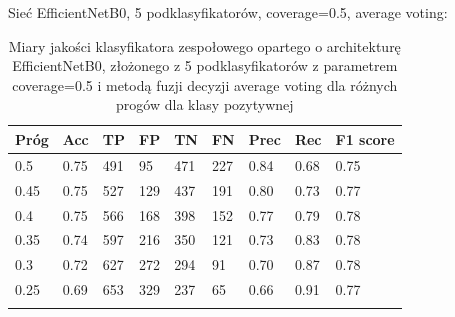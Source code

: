 \documentclass[polish,12pt]{aghthesis}
\begin{document}
\vspace{3.5mm}
\par\noindent Sieć EfficientNetB0, 5 podklasyfikatorów, coverage=0.5, average voting:
 \begin{longtable}[h!]{|m{2.0cm}|m{1.2cm}|m{1.2cm}|m{1.2cm}|m{1.2cm}|m{1.2cm}|m{1.2cm}|m{1.2cm}|m{1.6cm}|}
 \hline
 Próg & Acc & TP & FP & TN & FN & Prec & Rec & F1 score\\
 \hline
 0.5 & 0.75 & 491 & 95 & 471 & 227 & 0.84 & 0.68 & 0.75\\
 \hline
 0.45 & 0.75 & 527 & 129 & 437 & 191 & 0.80 & 0.73 & 0.77\\
 \hline
 0.4 & 0.75 & 566 & 168 & 398 & 152 & 0.77 & 0.79 & 0.78\\
 \hline
 0.35 & 0.74 & 597 & 216 & 350 & 121 & 0.73 & 0.83 & 0.78\\
 \hline
 0.3 & 0.72 & 627 & 272 & 294 & 91 & 0.70 & 0.87 & 0.78\\
 \hline
 0.25 & 0.69 & 653 & 329 & 237 & 65 & 0.66 & 0.91 & 0.77\\
 \hline
\caption{Miary jakości klasyfikatora zespołowego opartego o architekturę EfficientNetB0, złożonego z 5 podklasyfikatorów z parametrem coverage=0.5 i metodą fuzji decyzji average voting dla różnych progów dla klasy pozytywnej}
\label{table:39}
\end{longtable}
\end{document}
